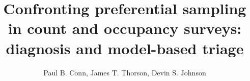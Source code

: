 \documentclass[times,mee,doublespace,]{besauth2}
\begin{document}


\title{Confronting preferential sampling in count and occupancy surveys: diagnosis and model-based triage \footnotemark[2]}

\author{Paul B. Conn\corrauth, James T. Thorson, Devin S. Johnson}


\address{National Marine Mammal Laboratory, Alaska Fisheries Science Center, NOAA National Marine Fisheries Service, 7600 Sand Point Way NE, Seattle, WA 98115 USA;  Fisheries Resource Assessment and Monitoring Division (FRAM), Northwest Fisheries Science Center, National Marine Fisheries Service (NMFS),
NOAA, 2725 Montlake Boulevard E, Seattle, WA 98112, USA}

\end{document}

